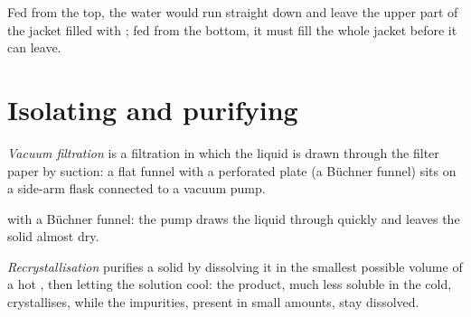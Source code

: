 \begin{remark}\label{rem:g10:synthesis-yield:water}
Fed from the top, the water would run straight down and leave the
upper part of the jacket filled with ; fed from the bottom, it must
fill the whole jacket before it can leave.
\end{remark}

\section{Isolating and purifying}

\begin{definition}\label{def:g10:synthesis-yield:vacuum-filtration}
\emph{Vacuum filtration} is a filtration in
which the liquid is drawn through the filter paper by suction: a flat
funnel with a perforated plate (a Büchner funnel) sits on a side-arm
flask connected to a vacuum pump.
\end{definition}

\begin{omfigure}

{\small {} with a Büchner funnel: the pump draws the
liquid through quickly and leaves the solid almost dry.}
\end{omfigure}

\begin{definition}[Recrystallisation]\label{def:g10:synthesis-yield:recrystallisation}
\emph{Recrystallisation} purifies a solid by
dissolving it in the smallest possible volume of a hot , then
letting the solution cool: the product, much less soluble in the cold,
crystallises, while the impurities, present in small amounts, stay
dissolved.
\end{definition}

